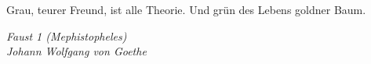 \epigraph{
	Grau, teurer Freund, ist alle Theorie.
	Und grün des Lebens goldner Baum.\footnotemark\ 
}{\textit{
	Faust 1 (Mephistopheles) \\ Johann Wolfgang von Goethe}}
